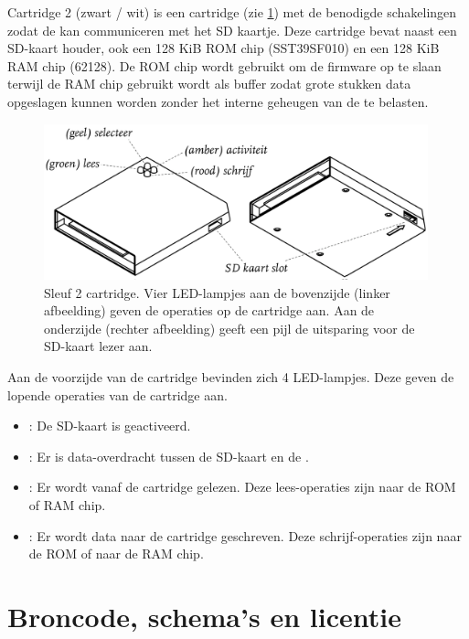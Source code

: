 
Cartridge 2 (zwart / wit) is een  cartridge (zie \cref{fig:cartridge-sleuf2}) met de benodigde schakelingen zodat de  kan communiceren met het SD kaartje. Deze cartridge bevat naast een SD-kaart houder, ook een 128 KiB ROM chip (SST39SF010) en een 128 KiB RAM chip (62128). De ROM chip wordt gebruikt om de firmware op te slaan terwijl de RAM chip gebruikt wordt als buffer zodat grote stukken data opgeslagen kunnen worden zonder het interne geheugen van de  te belasten.

\begin{figure}[h!]
    \centering
    \includegraphics[width=0.99\textwidth]{img/sd-card-cartridge.png}
    \caption{Sleuf 2 cartridge. Vier LED-lampjes aan de bovenzijde (linker afbeelding) geven de operaties op de cartridge aan. Aan de onderzijde (rechter afbeelding) geeft een pijl de uitsparing voor de SD-kaart lezer aan.}
    \label{fig:cartridge-sleuf2}
\end{figure}

Aan de voorzijde van de cartridge bevinden zich 4 LED-lampjes. Deze geven de lopende operaties van de cartridge aan.

\begin{itemize}[noitemsep]
    \item {}: De SD-kaart is geactiveerd.
    \item {}: Er is data-overdracht tussen de SD-kaart en de .
    \item {}: Er wordt vanaf de cartridge gelezen. Deze lees-operaties zijn naar de ROM of RAM chip.
    \item {}: Er wordt data naar de cartridge geschreven. Deze schrijf-operaties zijn naar de ROM of naar de RAM chip.
\end{itemize}

%
%
%
\section{Broncode, schema's en licentie}

